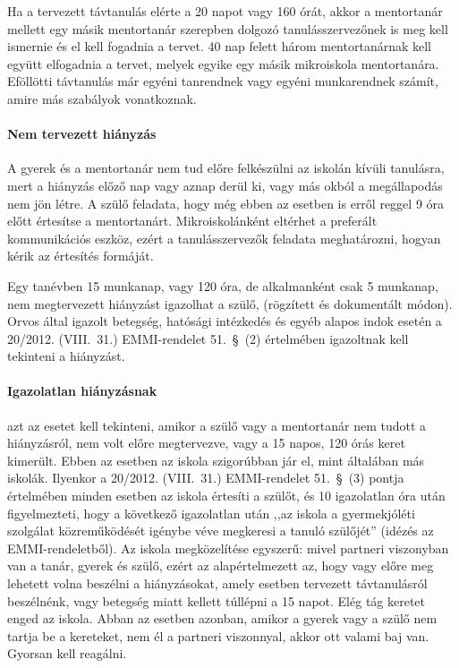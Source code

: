 Ha a tervezett távtanulás elérte a 20 napot vagy 160 órát, akkor a mentortanár mellett egy másik mentortanár szerepben dolgozó tanulásszervezőnek is meg kell ismernie és el kell fogadnia a tervet. 40 nap felett három mentortanárnak kell együtt elfogadnia a tervet, melyek egyike egy másik mikroiskola mentortanára. Eföllötti távtanulás már egyéni tanrendnek vagy egyéni munkarendnek számít, amire más szabályok vonatkoznak.


\paragraph{Nem tervezett hiányzás} A gyerek és a mentortanár nem tud előre felkészülni az iskolán kívüli tanulásra, mert a hiányzás előző nap vagy aznap derül ki, vagy más okból a megállapodás nem jön létre. A szülő feladata, hogy még ebben az esetben is erről reggel 9 óra előtt értesítse a mentortanárt. Mikroiskolánként eltérhet a preferált kommunikációs eszköz, ezért a tanulásszervezők feladata meghatározni, hogyan kérik az értesítés formáját.

Egy tanévben 15 munkanap, vagy 120 óra, de alkalmanként csak 5 munkanap, nem megtervezett hiányzást igazolhat a szülő, 
(rögzített és dokumentált módon). Orvos által igazolt betegség, hatósági intézkedés és egyéb alapos indok esetén a 20/2012. (VIII.~31.) EMMI-rendelet 51.~§~(2) értelmében igazoltnak kell tekinteni a hiányzást.

\paragraph{Igazolatlan hiányzásnak} azt az esetet kell tekinteni, amikor a szülő vagy a mentortanár nem tudott a hiányzásról, nem volt előre megtervezve, vagy a 15 napos, 120 órás keret kimerült. Ebben az esetben az iskola szigorúbban jár el, mint általában más iskolák. Ilyenkor a 20/2012. (VIII.~31.) EMMI-rendelet 51.~§~(3) pontja értelmében minden esetben az iskola értesíti a szülőt, és 10 igazolatlan óra után figyelmezteti, hogy a következő igazolatlan után ,,az iskola a gyermekjóléti szolgálat közreműködését igénybe véve megkeresi a tanuló szülőjét'' (idézés az EMMI-rendeletből). Az iskola megközelítése egyszerű: mivel partneri viszonyban van a tanár, gyerek és szülő, ezért az alapértelmezett az, hogy vagy előre meg lehetett volna beszélni a hiányzásokat, amely esetben tervezett távtanulásról beszélnénk, vagy betegség miatt kellett túllépni a 15 napot. Elég tág keretet enged az iskola. Abban az esetben azonban, amikor a gyerek vagy a szülő nem tartja be a kereteket, nem él a partneri viszonnyal, akkor ott valami baj van. Gyorsan kell reagálni.


